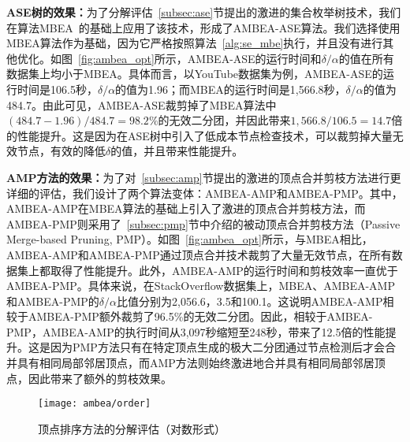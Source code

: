 

\textbf{ASE树的效果：}为了分解评估~\ref{subsec:ase}节提出的激进的集合枚举树技术，我们在算法MBEA~\cite{iMBEA14}的基础上应用了该技术，形成了AMBEA-ASE算法。我们选择使用MBEA算法作为基础，因为它严格按照算法~\ref{alg:se_mbe}执行，并且没有进行其他优化。如图~\ref{fig:ambea_opt}所示，AMBEA-ASE的运行时间和$\delta/\alpha$的值在所有数据集上均小于MBEA。具体而言，以YouTube数据集为例，AMBEA-ASE的运行时间是106.5秒，$\delta/\alpha$的值为1.96；而MBEA的运行时间是1,566.8秒，$\delta/\alpha$的值为484.7。由此可见，AMBEA-ASE裁剪掉了MBEA算法中$(484.7-1.96)/484.7=98.2\%$的无效二分团，并因此带来$1,566.8/106.5=14.7$倍的性能提升。这是因为在ASE树中引入了低成本节点检查技术，可以裁剪掉大量无效节点，有效的降低$\delta$的值，并且带来性能提升。

\textbf{AMP方法的效果：}为了对~\ref{subsec:amp}节提出的激进的顶点合并剪枝方法进行更详细的评估，我们设计了两个算法变体：AMBEA-AMP和AMBEA-PMP。其中，AMBEA-AMP在MBEA算法的基础上引入了激进的顶点合并剪枝方法，而AMBEA-PMP则采用了~\ref{subsec:pmp}节中介绍的被动顶点合并剪枝方法（Passive Merge-based Pruning, PMP）。如图~\ref{fig:ambea_opt}所示，与MBEA相比，AMBEA-AMP和AMBEA-PMP通过顶点合并技术裁剪了大量无效节点，在所有数据集上都取得了性能提升。此外，AMBEA-AMP的运行时间和剪枝效率一直优于AMBEA-PMP。具体来说，在StackOverflow数据集上，MBEA、AMBEA-AMP和AMBEA-PMP的$\delta/\alpha$比值分别为2,056.6，3.5和100.1。这说明AMBEA-AMP相较于AMBEA-PMP额外裁剪了96.5\%的无效二分团。因此，相较于AMBEA-PMP，AMBEA-AMP的执行时间从3,097秒缩短至248秒，带来了12.5倍的性能提升。这是因为PMP方法只有在特定顶点生成的极大二分团通过节点检测后才会合并具有相同局部邻居顶点，而AMP方法则始终激进地合并具有相同局部邻居顶点，因此带来了额外的剪枝效果。

\begin{figure} [H]
	\centering

		\texttt{[image: ambea/order]}


	\caption{顶点排序方法的分解评估（对数形式）}
	\label{fig:ambea_opt_order}
\end{figure}

